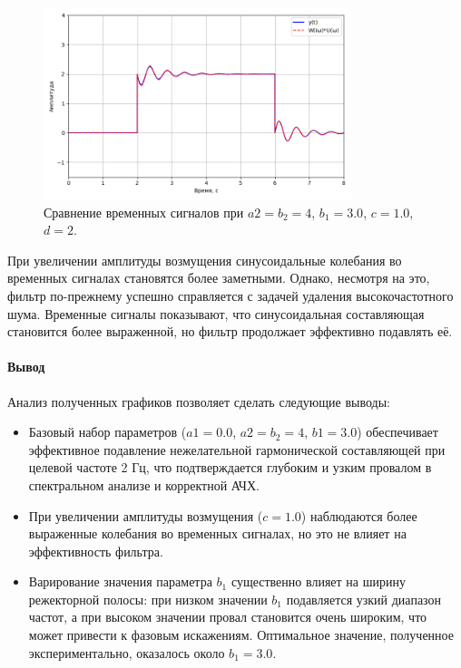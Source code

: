\documentclass[a4paper]{article}
\begin{document}
\begin{figure}[H]
  \centering
  \includegraphics[width=0.8\textwidth]{src/task_1_2/6. time_comp_157_3_1.0.png}
  \caption{Сравнение временных сигналов при $a2 = b_2 = 4$, $b_1=3.0$, $c=1.0$, $d=2$.}
\end{figure}
\noindent При увеличении амплитуды возмущения синусоидальные колебания во временных сигналах становятся более заметными. Однако, несмотря на это, фильтр по-прежнему успешно справляется с задачей удаления высокочастотного шума. Временные сигналы показывают, что синусоидальная составляющая становится более выраженной, но фильтр продолжает эффективно подавлять её.

\paragraph{Вывод} Анализ полученных графиков позволяет сделать следующие выводы:
\begin{itemize}
    \item Базовый набор параметров ($a1=0.0$, $a2 = b_2 = 4$, $b1 = 3.0$) обеспечивает эффективное подавление нежелательной гармонической составляющей при целевой частоте 2 Гц, что подтверждается глубоким и узким провалом в спектральном анализе и корректной АЧХ.
    \item При увеличении амплитуды возмущения ($c=1.0$) наблюдаются более выраженные колебания во временных сигналах, но это не влияет на эффективность фильтра.
    \item Варирование значения параметра $b_1$ существенно влияет на ширину режекторной полосы: при низком значении $b_1$ подавляется узкий диапазон частот, а при высоком значении провал становится очень широким, что может привести к фазовым искажениям. Оптимальное значение, полученное экспериментально, оказалось около $b_1=3.0$.
\end{itemize}
\end{document}
